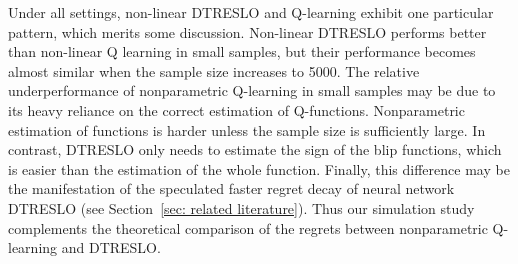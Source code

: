 \documentclass[preprint] {imsart}
\begin{document}



 


Under all settings, non-linear DTRESLO and Q-learning exhibit one particular pattern, which merits some discussion. Non-linear DTRESLO performs better than non-linear Q learning in small samples, but their performance becomes almost similar when the sample size increases to 5000. The relative underperformance of nonparametric Q-learning in small samples may be due to its heavy  reliance  on the correct estimation of  Q-functions. Nonparametric estimation of functions is harder unless the sample size is sufficiently large. In contrast, DTRESLO only needs to estimate  the sign of the blip functions, which is easier than the estimation of the whole function. Finally, this difference may be the manifestation of the speculated faster regret decay of neural network DTRESLO (see  Section~\ref{sec: related literature}). Thus our simulation study complements the theoretical comparison of the regrets between nonparametric Q-learning and DTRESLO.
\end{document}
